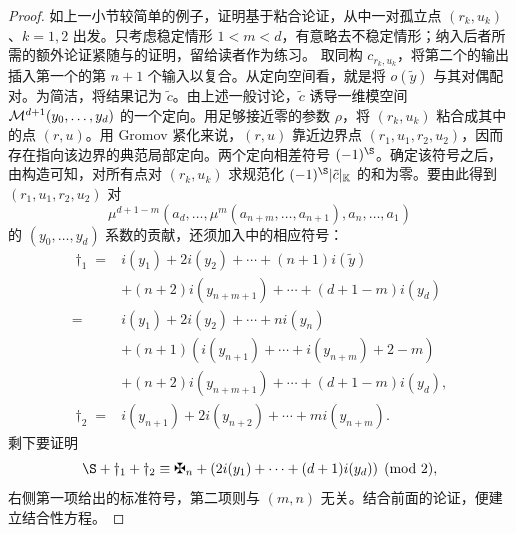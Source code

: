 \begin{proof}
如上一小节较简单的例子，证明基于粘合论证，从中一对孤立点 $(r_k,\allowbreak u_k)$、$k=1,\allowbreak 2$ 出发。只考虑稳定情形 $1<m<d$，有意略去不稳定情形；纳入后者所需的额外论证紧随与的证明，留给读者作为练习。
取同构 $c_{r_k,\allowbreak u_k}$，将第二个的输出插入第一个的第 $n+1$ 个输入以复合。从定向空间看，就是将 $o(\tilde y)$ 与其对偶配对。为简洁，将结果记为 $\tilde c$。由上述一般讨论，$\tilde c$ 诱导一维模空间 $\mathcal M^{d+1}(y_0,\allowbreak \ldots,\allowbreak y_d)$ 的一个定向。用足够接近零的参数 $\rho$，将 $(r_k,\allowbreak u_k)$ 粘合成其中的点 $(r,\allowbreak u)$。用 Gromov 紧化来说，$(r,\allowbreak u)$ 靠近边界点 $(r_1,\allowbreak u_1,\allowbreak r_2,\allowbreak u_2)$，因而存在指向该边界的典范局部定向。两个定向相差符号 $(-1)^{\S}$。确定该符号之后，由构造可知，对所有点对 $(r_k,\allowbreak u_k)$ 求规范化 $(-1)^{\S}|\tilde c|_{\K}$ 的和为零。要由此得到 $(r_1,\allowbreak u_1,\allowbreak r_2,\allowbreak u_2)$ 对
\[
\mu^{d+1-m}(a_d,\ldots,\mu^m(a_{n+m},\ldots,a_{n+1}),a_n,\ldots,a_1)
\]
的 $(y_0,\allowbreak \ldots,\allowbreak y_d)$ 系数的贡献，还须加入中的相应符号：
\[
\begin{aligned}
\dagger_1={}&i(y_1)+2i(y_2)+\cdots+(n+1)i(\tilde y)\\
&+(n+2)i(y_{n+m+1})+\cdots+(d+1-m)i(y_d)\\
={}&i(y_1)+2i(y_2)+\cdots+ni(y_n)\\
&+(n+1)(i(y_{n+1})+\cdots+i(y_{n+m})+2-m)\\
&+(n+2)i(y_{n+m+1})+\cdots+(d+1-m)i(y_d),\\
\dagger_2={}&i(y_{n+1})+2i(y_{n+2})+\cdots+mi(y_{n+m}).
\end{aligned}
\]
剩下要证明
\begin{equation}\label{eq:12.25}
\S+\dagger_1+\dagger_2\equiv\sgnmark_n+(2i(y_1)+\cdots+(d+1)i(y_d))\pmod2,
\end{equation}
右侧第一项给出的标准符号，第二项则与 $(m,\allowbreak n)$ 无关。结合前面的论证，便建立结合性方程。


\end{proof}
